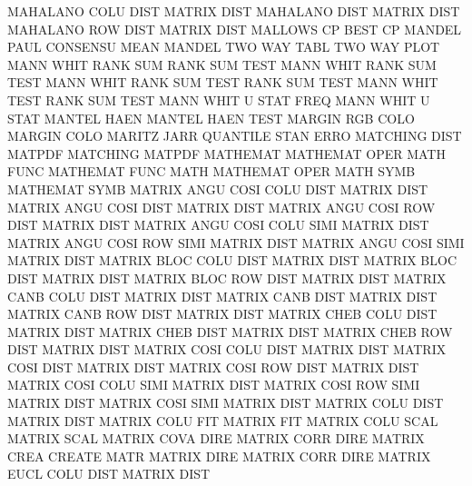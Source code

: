 MAHALANO COLU DIST                      MATRIX   DIST
MAHALANO DIST                           MATRIX   DIST
MAHALANO ROW  DIST                      MATRIX   DIST
MALLOWS  CP                             BEST     CP
MANDEL   PAUL                           CONSENSU MEAN
MANDEL   TWO  WAY  TABL                 TWO      WAY  PLOT
MANN     WHIT RANK SUM                  RANK     SUM  TEST
MANN     WHIT                           RANK     SUM  TEST
MANN     WHIT RANK SUM  TEST            RANK     SUM  TEST
MANN     WHIT TEST                      RANK     SUM  TEST
MANN     WHIT U    STAT FREQ            MANN     WHIT U    STAT
MANTEL   HAEN                           MANTEL   HAEN TEST
MARGIN   RGB  COLO                      MARGIN   COLO
MARITZ   JARR                           QUANTILE STAN ERRO
MATCHING DIST                           MATPDF
MATCHING                                MATPDF
MATHEMAT                                MATHEMAT OPER
MATH     FUNC                           MATHEMAT FUNC
MATH                                    MATHEMAT OPER
MATH     SYMB                           MATHEMAT SYMB
MATRIX   ANGU COSI COLU DIST            MATRIX   DIST
MATRIX   ANGU COSI DIST                 MATRIX   DIST
MATRIX   ANGU COSI ROW  DIST            MATRIX   DIST
MATRIX   ANGU COSI COLU SIMI            MATRIX   DIST
MATRIX   ANGU COSI ROW  SIMI            MATRIX   DIST
MATRIX   ANGU COSI SIMI                 MATRIX   DIST
MATRIX   BLOC COLU DIST                 MATRIX   DIST
MATRIX   BLOC DIST                      MATRIX   DIST
MATRIX   BLOC ROW  DIST                 MATRIX   DIST
MATRIX   CANB COLU DIST                 MATRIX   DIST
MATRIX   CANB DIST                      MATRIX   DIST
MATRIX   CANB ROW  DIST                 MATRIX   DIST
MATRIX   CHEB COLU DIST                 MATRIX   DIST
MATRIX   CHEB DIST                      MATRIX   DIST
MATRIX   CHEB ROW  DIST                 MATRIX   DIST
MATRIX   COSI COLU DIST                 MATRIX   DIST
MATRIX   COSI DIST                      MATRIX   DIST
MATRIX   COSI ROW  DIST                 MATRIX   DIST
MATRIX   COSI COLU SIMI                 MATRIX   DIST
MATRIX   COSI ROW  SIMI                 MATRIX   DIST
MATRIX   COSI SIMI                      MATRIX   DIST
MATRIX   COLU DIST                      MATRIX   DIST
MATRIX   COLU FIT                       MATRIX   FIT
MATRIX   COLU SCAL                      MATRIX   SCAL
MATRIX   COVA DIRE                      MATRIX   CORR DIRE
MATRIX   CREA                           CREATE   MATR
MATRIX   DIRE                           MATRIX   CORR DIRE
MATRIX   EUCL COLU DIST                 MATRIX   DIST
